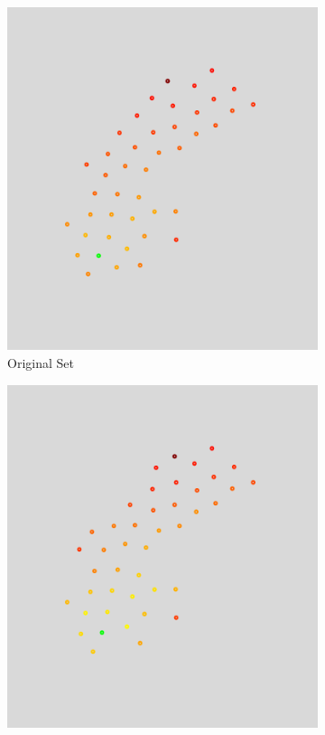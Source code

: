 \begin{figure}[H] 
  \begin{subfigure}[b]{0.32\linewidth}
		\centering
		\includegraphics[width=0.9\linewidth]{Pictures/10_sweden} 
		\caption{\small Original Set} 
		\label{fig:sweden} 
		\vspace{4ex}
  \end{subfigure}
  \begin{subfigure}[b]{0.32\linewidth}
    \centering
    \includegraphics[width=0.9\linewidth]{Pictures/kd_10_sweden} 

\end{subfigure}
\end{figure}
